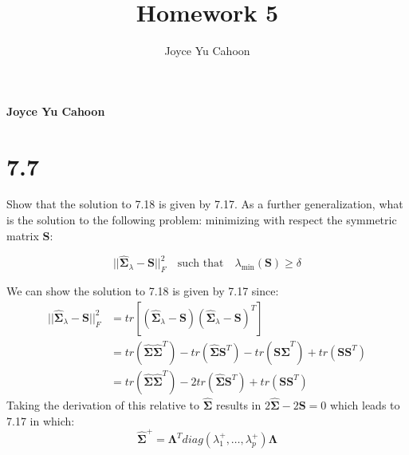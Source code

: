 \documentclass[11pt,]{article}
\title{Homework 5  }
\author{\Large Joyce Yu Cahoon\vspace{0.05in} \newline\normalsize\emph{}  }
\date{}
\newcommand*{\authorfont}{\fontfamily{phv}\selectfont}
\begin{document}
%

{%
\setlength{\parindent}{0pt}
\thispagestyle{plain}
{\fontsize{18}{20}\selectfont\raggedright 
\maketitle  %

}

{
  \vskip 13.5pt\relax \normalsize\fontsize{11}{12} 
  \textbf{\authorfont Joyce Yu Cahoon} \hskip 15pt \emph{\small }   
  
}

}






\vskip 6.5pt


\noindent  \hypertarget{section}{%
\section{7.7}\label{section}}

Show that the solution to 7.18 is given by 7.17. As a further
generalization, what is the solution to the following problem:
minimizing with respect the symmetric matrix \({\bm{{S}}}\):

\[
||\hat{{\bm{{\Sigma}}}}_{\lambda} - {\bm{{S}}}||^2_{F} \quad \text{such that} \quad \lambda_{\min}({\bm{{S}}}) \geq \delta
\]

We can show the solution to 7.18 is given by 7.17 since: \[
\begin{aligned}
||\hat{{\bm{{\Sigma}}}}_{\lambda} - {\bm{{S}}}||^2_{F} &= tr[(\hat{{\bm{{\Sigma}}}}_{\lambda} - {\bm{{S}}})(\hat{{\bm{{\Sigma}}}}_{\lambda} - {\bm{{S}}})^T] \\
&= tr(\hat{{\bm{{\Sigma}}}}\hat{{\bm{{\Sigma}}}}^T) - tr(\hat{{\bm{{\Sigma}}}} {\bm{{S}}}^T) - tr({\bm{{S}}} \hat{{\bm{{\Sigma}}}}^T) + tr({\bm{{S}}}{\bm{{S}}}^T) \\
&= tr(\hat{{\bm{{\Sigma}}}} \hat{{\bm{{\Sigma}}}}^T) - 2tr(\hat{{\bm{{\Sigma}}}} {\bm{{S}}}^T) +  tr({\bm{{S}}}{\bm{{S}}}^T) 
\end{aligned}
\] Taking the derivation of this relative to \(\hat{{\bm{{\Sigma}}}}\)
results in \(2\hat{{\bm{{\Sigma}}}} - 2{\bm{{S}}} = 0\) which leads to
7.17 in which: \[
\hat{{\bm{{\Sigma}}}}^+ = {\bm{{\Lambda}}}^T diag(\lambda_1^+, \ldots, \lambda_p^+) {\bm{{\Lambda}}}
\]
\end{document}
